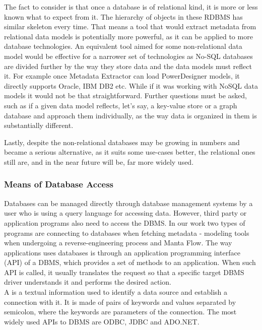 The fact to consider is that once a database is of relational kind, it is more or less known what to expect from it. 
The hierarchy of objects in these RDBMS has similar skeleton every time. 
That means a tool that would extract metadata from relational data models is potentially more powerful, as it can be applied to more database technologies. 
An equivalent tool aimed for some non-relational data model would be effective for a narrower set of technologies as No-SQL databases are divided further by the way they store data and the data models must reflect it.
For example once Metadata Extractor can load PowerDesigner models, it directly supports Oracle, IBM DB2 etc.
While if it was working with NoSQL data models it would not be that straightforward. Further questions must be asked, such as if a given data model reflects, let's say, a key-value store or a graph database and approach them individually, as the way data is organized in them is substantially different.

Lastly, despite the non-relational databases may be growing in numbers and became a serious alternative, as it suits some use-cases better, the relational ones still are, and in the near future will be, far more widely used.

\subsubsection{Means of Database Access}

Databases can be managed directly through database management systems by a user who is using a query language for accessing data. 
However, third party or application programs also need to access the DBMS. 
In our work two types of programs are connecting to databases when fetching metadata - modeling tools when undergoing a reverse-engineering process and Manta Flow.
The way applications uses databases is through an application programming interface (API) of a DBMS, which provides a set of methods to an application.
When such API is called, it usually translates the request so that a specific target DBMS driver understands it and performs the desired action. \\

A  is a textual information used to identify a data source and establish a connection with it. It is made of pairs of keywords and values separated by semicolon, where the keywords are parameters of the connection. The most widely used APIs to DBMS are ODBC, JDBC and ADO.NET.

